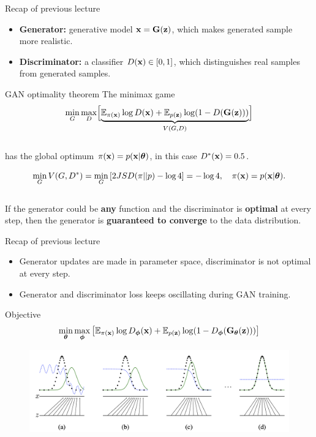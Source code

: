 \begin{frame}{Recap of previous lecture}
	\begin{itemize}
		\item \textbf{Generator:} generative model $\mathbf{x} = \mathbf{G}(\mathbf{z})$, which makes generated sample more realistic.
		\item \textbf{Discriminator:} a classifier $D(\mathbf{x}) \in [0, 1]$, which distinguishes real samples from generated samples.
	\end{itemize}
	\vspace{-0.1cm}
	\begin{block}{GAN optimality theorem}
		The minimax game 
		\vspace{-0.3cm}
		\[
		\min_{G} \max_D \Bigl[ \underbrace{\mathbb{E}_{\pi(\mathbf{x})} \log D(\mathbf{x}) + \mathbb{E}_{p(\mathbf{z})} \log (1 - D(\mathbf{G}(\mathbf{z})))}_{V(G, D)} \Bigr]
		\]
		\vspace{-0.5cm} \\
		has the global optimum $\pi(\mathbf{x}) = p(\mathbf{x} | \boldsymbol{\theta})$, in this case $D^*(\mathbf{x}) = 0.5$.
	\end{block}
	\[
		\min_{G} V(G, D^*) = \min_{G} \left[ 2 JSD(\pi || p) - \log 4 \right] = -\log 4, \quad \pi(\mathbf{x}) = p(\mathbf{x} | \boldsymbol{\theta}).
	\]
	\vspace{-0.5cm} \\
	If the generator could be \textbf{any} function and the discriminator is \textbf{optimal} at every step, then the generator is \textbf{guaranteed to converge} to the data distribution.
\end{frame}
\begin{frame}{Recap of previous lecture}
	\begin{itemize}
		\item Generator updates are made in parameter space, discriminator is not optimal at every step.
		\item Generator and discriminator loss keeps oscillating during GAN training.
	\end{itemize}
	\begin{block}{Objective}
		\vspace{-0.5cm}
		\[
		\min_{\boldsymbol{\theta}} \max_{\boldsymbol{\phi}} \left[ \mathbb{E}_{\pi(\mathbf{x})} \log D_{\boldsymbol{\phi}}(\mathbf{x}) + \mathbb{E}_{p(\mathbf{z})} \log (1 - D_{\boldsymbol{\phi}}(\mathbf{G}_{\boldsymbol{\theta}}(\mathbf{z}))) \right]
		\]
		\vspace{-0.5cm}
	\end{block}
	\begin{figure}
		\centering
		\includegraphics[width=1.0\linewidth]{figs/gan_1}
	\end{figure}
\end{frame}

